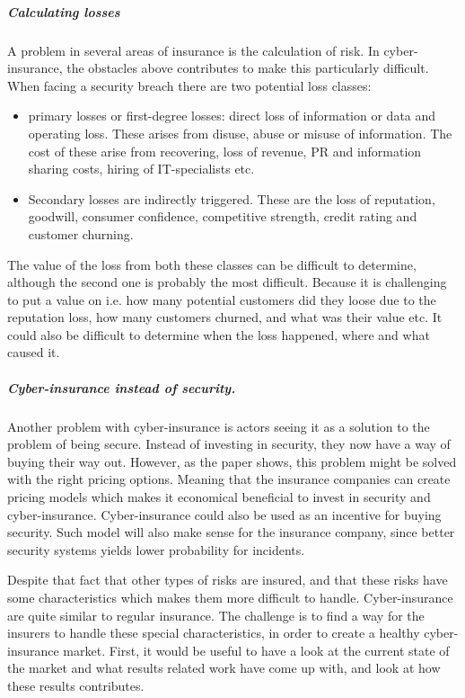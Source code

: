 \subparagraph{Calculating losses} A problem in several areas of insurance is the calculation of risk. In cyber-insurance, the obstacles above contributes to make this particularly difficult. When facing a security breach there are two potential loss classes:\cite{bandyopadhyay2009managers,mehr1980principles} 
\begin{itemize}
\item primary losses or first-degree losses: direct loss of information or data and operating loss. 
These arises from disuse, abuse or misuse of information.
 The cost of these arise from recovering, loss of revenue, 
 PR and information sharing costs, hiring of IT-specialists etc.
 \item Secondary losses are indirectly triggered. These are the loss of reputation, goodwill, 
consumer confidence, competitive strength, credit rating and customer churning. 
\end{itemize}
The value of the loss from both these classes can be difficult to determine, although the second one is probably the most difficult. Because it is challenging to put a value on i.e. how many potential customers did they loose due to the reputation loss, how many customers churned, and what was their value etc.
It could also be difficult to determine when the loss happened, where and what caused it.


\subparagraph{Cyber-insurance instead of security.}
Another problem with cyber-insurance is actors seeing it as a solution to the problem of being secure. Instead of investing in security, they now have a way of buying their way out. 
However, as the paper \cite{bolot2008cyber} shows, this problem might be solved with the right pricing options. Meaning that the insurance companies can create pricing models which makes it economical beneficial to invest in security and cyber-insurance. Cyber-insurance could also be used as an incentive for buying security. Such model will also make sense for the insurance company, since better security systems yields lower probability for incidents.


Despite that fact that other types of risks are insured, and that these risks have some characteristics which makes them more difficult to handle. Cyber-insurance are quite similar to regular insurance. The challenge is to find a way for the insurers to handle these special characteristics, in order to create a healthy cyber-insurance market. First, it would be useful to have a look at the current state of the market and what results related work have come up with, and look at how these results contributes. 